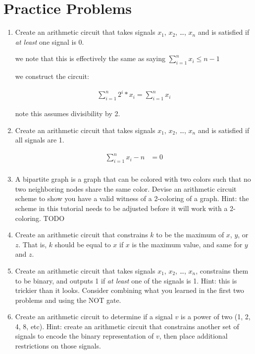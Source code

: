 \documentclass{article}
\begin{document}
\section{Practice Problems}

\begin{enumerate}
    \item Create an arithmetic circuit that takes signals $x_1$, $x_2$, \ldots, $x_n$ and is satisfied if \emph{at least} one signal is 0.

     we note that this is effectively the same as saying $\sum_{i=1}^n x_i \leq n-1$

     we construct the circuit:

     \begin{align*}
          \sum_{i=1}^{n} 2^{i}*x_i = \sum_{i=1}^n x_i
     \end{align*}

     note this assumes divisibility by 2.

    
    \item Create an arithmetic circuit that takes signals $x_1$, $x_2$, \ldots, $x_n$ and is satisfied if all signals are 1.

     \begin{align*}
          \sum_{i=1}^n x_i -n &= 0 \\
     \end{align*}
    \item A bipartite graph is a graph that can be colored with two colors such that no two neighboring nodes share the same color. Devise an arithmetic circuit scheme to show you have a valid witness of a 2-coloring of a graph. Hint: the scheme in this tutorial needs to be adjusted before it will work with a 2-coloring.
    TODO
    \item Create an arithmetic circuit that constrains $k$ to be the maximum of $x$, $y$, or $z$. That is, $k$ should be equal to $x$ if $x$ is the maximum value, and same for $y$ and $z$.
    
    \item Create an arithmetic circuit that takes signals $x_1$, $x_2$, \ldots, $x_n$, constrains them to be binary, and outputs 1 if \emph{at least} one of the signals is 1. Hint: this is trickier than it looks. Consider combining what you learned in the first two problems and using the NOT gate.
    
    \item Create an arithmetic circuit to determine if a signal $v$ is a power of two (1, 2, 4, 8, etc). Hint: create an arithmetic circuit that constrains another set of signals to encode the binary representation of $v$, then place additional restrictions on those signals.
    

\end{enumerate}
\end{document}
